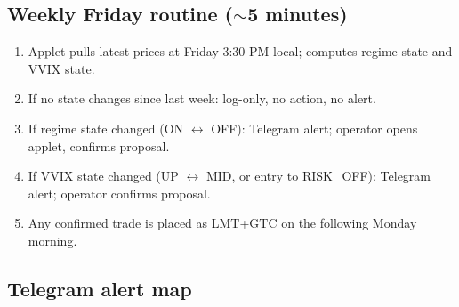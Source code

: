 \documentclass[11pt,a4paper]{article}
\begin{document}
\subsection{Weekly Friday routine ($\sim$5 minutes)}

\begin{enumerate}[noitemsep]
    \item Applet pulls latest prices at Friday 3:30 PM local; computes regime state and VVIX state.
    \item If no state changes since last week: log-only, no action, no alert.
    \item If regime state changed (ON $\leftrightarrow$ OFF): Telegram alert; operator opens applet, confirms proposal.
    \item If VVIX state changed (UP $\leftrightarrow$ MID, or entry to RISK\_OFF): Telegram alert; operator confirms proposal.
    \item Any confirmed trade is placed as LMT+GTC on the following Monday morning.
\end{enumerate}

\subsection{Telegram alert map}
\end{document}
